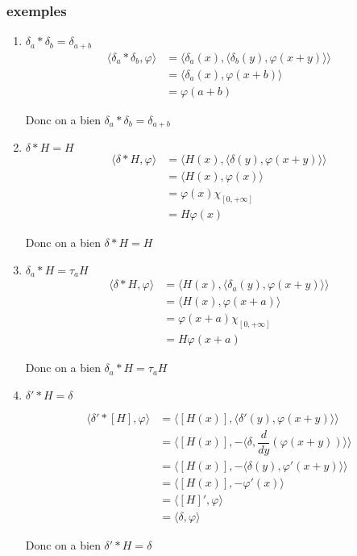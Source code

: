 \documentclass[12pt,a4paper]{report}
\begin{document}
\subsubsection{exemples}
\begin{enumerate}
	\item \(\delta_a * \delta_b = \delta_{a+b}\)
	\begin{align*}
		\langle \delta_a * \delta_b, \varphi \rangle &= \langle \delta_a(x), \langle \delta_b (y), \varphi(x+y)\rangle\rangle\\
		&= \langle \delta_a(x), \varphi(x + b) \rangle\\
		&= \varphi(a+b)
	\end{align*}
	
	Donc on a bien \(\delta_a * \delta_b = \delta_{a+b}\)
	
	\item \(\delta * H = H\)
	\begin{align*}
		\langle \delta * H, \varphi \rangle &= \langle H(x), \langle \delta (y), \varphi(x+y)\rangle\rangle\\
		&= \langle H(x), \varphi (x) \rangle\\
		&= \varphi(x) \chi_{[0, + \infty]}\\
		&= H\varphi(x)
	\end{align*}
	
	Donc on a bien \(\delta * H = H\)
	
	\item \(\delta_a * H = \tau_a H\)
	\begin{align*}
		\langle \delta * H, \varphi \rangle &= \langle H(x), \langle \delta_a (y), \varphi(x+y)\rangle\rangle\\
		&= \langle H(x), \varphi (x+a) \rangle\\
		&= \varphi(x+a) \chi_{[0, + \infty]}\\
		&= H\varphi(x+a)
	\end{align*}
	
	Donc on a bien \(\delta_a * H = \tau_a H\)
	
	\item \(\delta' * H = \delta\)
	
	\begin{align*}
		\langle \delta' * [H], \varphi \rangle &= \langle [H(x)], \langle \delta'(y), \varphi(x+y) \rangle \rangle\\
		&= \langle [ H(x)], - \langle \delta, \dfrac{d}{dy} (\varphi(x+y)) \rangle \rangle\\
		&= \langle [H(x)], - \langle \delta(y), \varphi'(x+y)\rangle \rangle\\
		&= \langle [H(x)], - \varphi'(x) \rangle\\
		&= \langle [H]', \varphi \rangle\\
		&= \langle \delta, \varphi \rangle
	\end{align*}
	
	Donc on a bien \(\delta' * H = \delta\)
	
\end{enumerate}
\end{document}
